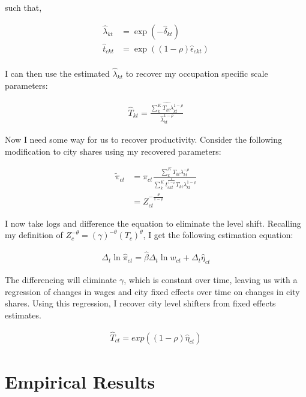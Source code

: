 \documentclass[10pt]{article}
\begin{document}
such that,

\begin{align*}
    \hat{\lambda}_{kt} & = \exp \left( - \hat{\delta}_{kt} \right)             \\
    \hat{t}_{ckt}      & = \exp \left( (1 - \rho) \hat{\epsilon}_{ckt} \right) \\
\end{align*}

I can then use the estimated $\hat{\lambda}_{kt}$ to recover my occupation specific scale parameters:

\begin{align*}
    \hat{T}_{kt} = \frac{\widehat{\sum_{k}^{K} T_{kt} \lambda_{kt}^{1 - \rho}}}{\hat{\lambda}_{kt}^{1 - \rho}}
\end{align*}

Now I need some way for us to recover productivity. Consider the following modification to city shares using my recovered parameters:

\begin{align*}
    \tilde{\pi}_{ct} & = \pi_{ct} \frac{\sum_{k}^{K} T_{kt} \lambda_{kt}^{- \rho}}{\sum_{k}^{K} t_{ckt}^{\frac{1}{1 - \rho}} T_{kt} \lambda_{kt}^{1 - \rho}} \\
                     & = Z_{ct}^{- \frac{\theta}{1 - \rho}}
\end{align*}

I now take logs and difference the equation to eliminate the level shift. Recalling my definition of $Z_c^{- \theta} = (\gamma)^{- \theta} (T_c)^{\theta}$, I get the following estimation equation:

\begin{align*}
    \Delta_t \ln \hat{\pi}_{ct} = \hat{\beta} \Delta_t \ln w_{ct} + \Delta_t \hat{\eta}_{ct}
\end{align*}

The differencing will eliminate $\gamma$, which is constant over time, leaving us with a regression of changes in wages and city fixed effects over time on changes in city shares. Using this regression, I recover city level shifters from fixed effects estimates.

\begin{align*}
    \hat{T}_{ct} = exp \left( (1 - \rho) \hat{\eta}_{ct} \right)
\end{align*}

\section{Empirical Results}
\end{document}
